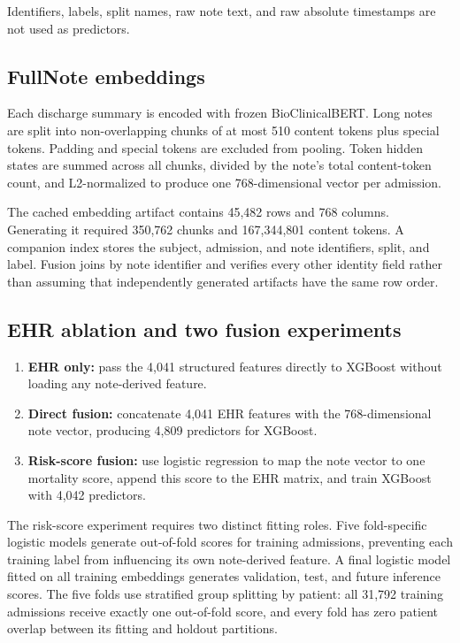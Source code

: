 \documentclass[11pt]{article}
\begin{document}
Identifiers, labels, split names, raw note text, and raw absolute timestamps are
not used as predictors.

\subsection{FullNote embeddings}

Each discharge summary is encoded with frozen BioClinicalBERT. Long notes are
split into non-overlapping chunks of at most 510 content tokens plus special
tokens. Padding and special tokens are excluded from pooling. Token hidden states
are summed across all chunks, divided by the note's total content-token count,
and L2-normalized to produce one 768-dimensional vector per admission.

The cached embedding artifact contains 45,482 rows and 768 columns. Generating it
required 350,762 chunks and 167,344,801 content tokens. A companion index stores
the subject, admission, and note identifiers, split, and label. Fusion joins by
note identifier and verifies every other identity field rather than assuming
that independently generated artifacts have the same row order.

\subsection{EHR ablation and two fusion experiments}

\begin{enumerate}
  \item \textbf{EHR only:} pass the 4,041 structured features directly to
        XGBoost without loading any note-derived feature.
  \item \textbf{Direct fusion:} concatenate 4,041 EHR features with the
        768-dimensional note vector, producing 4,809 predictors for XGBoost.
  \item \textbf{Risk-score fusion:} use logistic regression to map the note
        vector to one mortality score, append this score to the EHR matrix, and
        train XGBoost with 4,042 predictors.
\end{enumerate}

The risk-score experiment requires two distinct fitting roles. Five fold-specific
logistic models generate out-of-fold scores for training admissions, preventing
each training label from influencing its own note-derived feature. A final
logistic model fitted on all training embeddings generates validation, test, and
future inference scores. The five folds use stratified group splitting by patient:
all 31,792 training admissions receive exactly one out-of-fold score, and every
fold has zero patient overlap between its fitting and holdout partitions.
\end{document}
